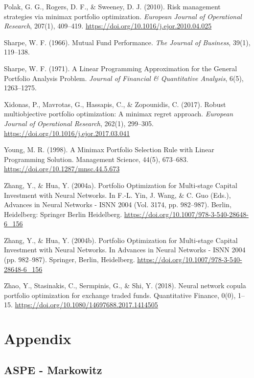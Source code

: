\documentclass[11pt]{article} %
\begin{document}
\begin{thebibliography}{1}
 Polak, G. G., Rogers, D. F., \& Sweeney, D. J. (2010). Risk management strategies via minimax portfolio optimization.\emph{ European Journal of Operational Research}, 207(1), 409–419. \url{https://doi.org/10.1016/j.ejor.2010.04.025} 

 Sharpe, W. F. (1966). Mutual Fund Performance. \emph{The Journal of Business}, 39(1), 119–138.

 Sharpe, W. F. (1971). A Linear Programming Approximation for the General Portfolio Analysis Problem. \emph{Journal of Financial \& Quantitative Analysis}, 6(5), 1263–1275.

 Xidonas, P., Mavrotas, G., Hassapis, C., \& Zopounidis, C. (2017). Robust multiobjective portfolio optimization: A minimax regret approach. \emph{European Journal of Operational Research}, 262(1), 299–305. \url{https://doi.org/10.1016/j.ejor.2017.03.041}

 Young, M. R. (1998). A Minimax Portfolio Selection Rule with Linear Programming Solution. Management Science, 44(5), 673–683. \url{https://doi.org/10.1287/mnsc.44.5.673}

 Zhang, Y., \& Hua, Y. (2004a). Portfolio Optimization for Multi-stage Capital Investment with Neural Networks. In F.-L. Yin, J. Wang, \& C. Guo (Eds.), Advances in Neural Networks - ISNN 2004 (Vol. 3174, pp. 982–987). Berlin, Heidelberg: Springer Berlin Heidelberg. \url{https://doi.org/10.1007/978-3-540-28648-6_156}

 Zhang, Y., \& Hua, Y. (2004b). Portfolio Optimization for Multi-stage Capital Investment with Neural Networks. In Advances in Neural Networks - ISNN 2004 (pp. 982–987). Springer, Berlin, Heidelberg. \url{https://doi.org/10.1007/978-3-540-28648-6_156}

 Zhao, Y., Stasinakis, C., Sermpinis, G., \& Shi, Y. (2018). Neural network copula portfolio optimization for exchange traded funds. Quantitative Finance, 0(0), 1–15. \url{https://doi.org/10.1080/14697688.2017.1414505}


\end{thebibliography}

\section*{Appendix}

\subsection*{ASPE - Markowitz}
\end{document}
